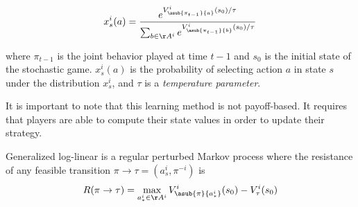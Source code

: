 
$$
x^i_s(a) = \dfrac{e^{V^i_{\asub{\pi_{t-1}}{a}}(s_0)/\tau}}{\sum_{b \in \AA^i} e^{V^i_{\asub{\pi_{t-1}}{b}}(s_0)/\tau} }
$$

where $\pi_{t-1}$ is the joint behavior played at time $t-1$ and $s_0$ is the initial state of the stochastic game. $x^i_s(a)$ is the probability of selecting action $a$ in state $s$ under the distribution $x^i_s$, and $\tau$ is a {\em temperature parameter}. 

It is important to note that this learning method is not payoff-based. It requires that players are able to compute their state values in order to update their strategy.


\begin{lem}
Generalized log-linear is a regular perturbed Markov process where the resistance of any feasible transition $\pi \rightarrow \tau = (a^i_s, \pi^{-i})$ is
$$
R(\pi \rightarrow \tau) = \max_{a^i_* \in \AA^i} V^i_{\asub{\pi}{a^i_*}}(s_0) - V^i_{\tau}(s_0)
$$
\end{lem}

